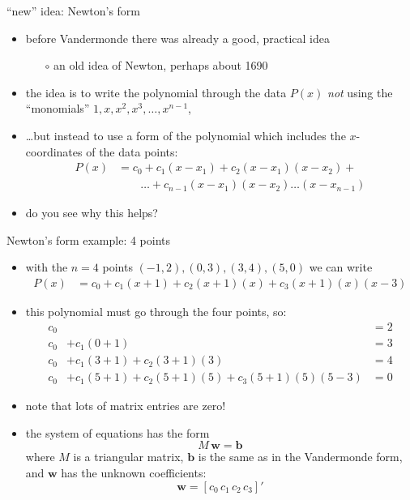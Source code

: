 \documentclass[10pt,hyperref]{beamer}
\newcommand{\bb}{\mathbf{b}}
\newcommand{\bw}{\mathbf{w}}
\begin{document}
\begin{frame}{``new'' idea: Newton's form}

\begin{itemize}
\item before Vandermonde there was already a good, practical idea
  \begin{itemize}
  \item[$\circ$] an old idea of Newton, perhaps about 1690
  \end{itemize}
\item the idea is to write the polynomial through the data $P(x)$ \emph{not} using the ``monomials'' $1,x,x^2,x^3,\dots,x^{n-1}$,
\item \dots but instead to use a form of the polynomial which includes the $x$-coordinates of the data points:
\begin{align*}
P(x) &= c_0 + c_1 (x-x_1) + c_2 (x - x_1)(x - x_2) + \\
     &\qquad \dots + c_{n-1} (x-x_1)(x-x_2) \dots (x-x_{n-1})
\end{align*}
\item do you see why this helps?

\end{itemize}
\end{frame}


\begin{frame}{Newton's form example: 4 points}

\begin{itemize}
\item with the $n=4$ points $(-1,2), (0,3), (3,4), (5,0)$ we can write
\begin{align*}
P(x) &= c_0 + c_1 (x+1) + c_2 (x +1)(x) + c_3 (x +1)(x) (x-3)
\end{align*}
\item this polynomial must go through the four points, so:
\begin{align*}
c_0 &                 &= 2 \\
c_0 &+ c_1 (0+1)                  &= 3 \\
c_0 &+ c_1 (3+1) + c_2 (3 +1)(3)  &= 4 \\
c_0 &+ c_1 (5+1) + c_2 (5 +1)(5) + c_3 (5 +1)(5) (5-3) &= 0 
\end{align*}
\item note that lots of matrix entries are zero!
\item the system of equations has the form
	$$M\, \bw = \bb$$
where $M$ is a triangular matrix, $\bb$ is the same as in the Vandermonde form, and $\bw$ has the unknown coefficients:
   $$\bw = [c_0\, c_1\, c_2\, c_3]'$$
\end{itemize}
\end{frame}
\end{document}
